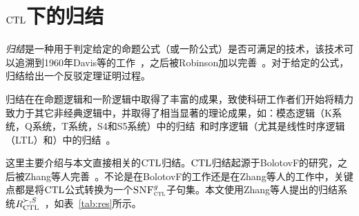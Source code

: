 \section{$\textrm{CTL}$下的归结}\label{chapter02:CTLres}

\emph{归结}是一种用于判定给定的命题公式（或一阶公式）是否可满足的技术，该技术可以追溯到1960年Davis等的工作~\cite{DBLP:journals/jacm/DavisP60}，之后被Robinson加以完善~\cite{DBLP:journals/jacm/Robinson65}。对于给定的公式，归结给出一个反驳定理证明过程。

归结在在命题逻辑和一阶逻辑中取得了丰富的成果，致使科研工作者们开始将精力致力于其它非经典逻辑中，并取得了相当显著的理论成果，如：模态逻辑（K系统，Q系统，T系统，S4和S5系统）中的归结~\cite{DBLP:journals/tcs/EnjalbertC89}和时序逻辑（尤其是线性时序逻辑（LTL）和\CTL）中的归结~\cite{DBLP:conf/cade/CavalliC84,DBLP:journals/jetai/BolotovF99}。

这里主要介绍与本文直接相关的$\textrm{CTL}$归结。$\textrm{CTL}$归结起源于BolotovF的研究\cite{DBLP:journals/jetai/BolotovF99}，之后被Zhang等人完善~\cite{zhang2014resolution}。不论是在BolotovF的工作还是在Zhang等人的工作中，关键点都是将$\textrm{CTL}$公式转换为一个${\textsc{SNF}_{\textsc{ctl}}^g}$子句集。本文使用Zhang等人提出的归结系统$R_{\textrm{CTL}}^{\succ,S}$~\cite{zhang2014resolution}，如表~\ref{tab:res}所示。

